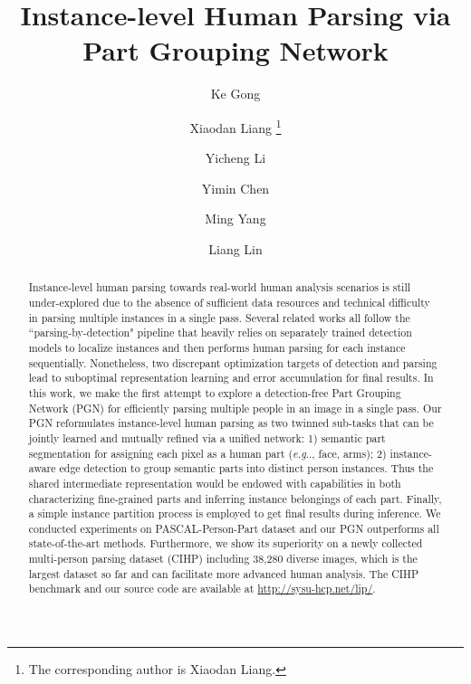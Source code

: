 \documentclass[runningheads]{llncs}
\makeatletter
\DeclareRobustCommand\onedot{\futurelet\@let@token\@onedot}
\def\@onedot{\ifx\@let@token.\else.\null\fi\xspace}
\def\eg{\emph{e.g}\onedot} \def\Eg{\emph{E.g}\onedot}
\makeatother
\begin{document}
\title{Instance-level Human Parsing via Part Grouping Network} 

\author{Ke Gong \and
Xiaodan Liang \thanks{The corresponding author is Xiaodan Liang.}\and
Yicheng Li \and
Yimin Chen \and
Ming Yang \and
Liang Lin}

\maketitle              \begin{abstract}
Instance-level human parsing towards real-world human analysis scenarios is still under-explored due to the absence of sufficient data resources and technical difficulty in parsing multiple instances in a single pass. Several related works all follow the ``parsing-by-detection" pipeline that heavily relies on separately trained detection models to localize instances and then performs human parsing for each instance sequentially. Nonetheless, two discrepant optimization targets of detection and parsing lead to suboptimal representation learning and error accumulation for final results. In this work, we make the first attempt to explore a detection-free Part Grouping Network (PGN) for efficiently parsing multiple people in an image in a single pass. Our PGN reformulates instance-level human parsing as two twinned sub-tasks that can be jointly learned and mutually refined via a unified network: 1) semantic part segmentation for assigning each pixel as a human part (\eg, face, arms); 2) instance-aware edge detection to group semantic parts into distinct person instances. Thus the shared intermediate representation would be endowed with capabilities in both characterizing fine-grained parts and inferring instance belongings of each part. Finally, a simple instance partition process is employed to get final results during inference. We conducted experiments on PASCAL-Person-Part dataset and our PGN outperforms all state-of-the-art methods. Furthermore, we show its superiority on a newly collected multi-person parsing dataset (CIHP) including 38,280 diverse images, which is the largest dataset so far and can facilitate more advanced human analysis. The CIHP benchmark and our source code are available at \url{http://sysu-hcp.net/lip/}. 

\end{abstract}
\end{document}
